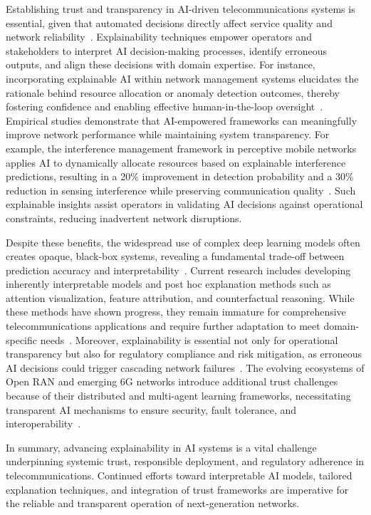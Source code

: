 \documentclass[sigconf]{acmart}
\begin{document}
Establishing trust and transparency in AI-driven telecommunications systems is essential, given that automated decisions directly affect service quality and network reliability~\cite{ref7,ref48,ref50,ref54}. Explainability techniques empower operators and stakeholders to interpret AI decision-making processes, identify erroneous outputs, and align these decisions with domain expertise. For instance, incorporating explainable AI within network management systems elucidates the rationale behind resource allocation or anomaly detection outcomes, thereby fostering confidence and enabling effective human-in-the-loop oversight~\cite{ref7}. Empirical studies demonstrate that AI-empowered frameworks can meaningfully improve network performance while maintaining system transparency. For example, the interference management framework in perceptive mobile networks applies AI to dynamically allocate resources based on explainable interference predictions, resulting in a 20\% improvement in detection probability and a 30\% reduction in sensing interference while preserving communication quality~\cite{ref48}. Such explainable insights assist operators in validating AI decisions against operational constraints, reducing inadvertent network disruptions.

Despite these benefits, the widespread use of complex deep learning models often creates opaque, black-box systems, revealing a fundamental trade-off between prediction accuracy and interpretability~\cite{ref54}. Current research includes developing inherently interpretable models and post hoc explanation methods such as attention visualization, feature attribution, and counterfactual reasoning. While these methods have shown progress, they remain immature for comprehensive telecommunications applications and require further adaptation to meet domain-specific needs~\cite{ref50}. Moreover, explainability is essential not only for operational transparency but also for regulatory compliance and risk mitigation, as erroneous AI decisions could trigger cascading network failures~\cite{ref48}. The evolving ecosystems of Open RAN and emerging 6G networks introduce additional trust challenges because of their distributed and multi-agent learning frameworks, necessitating transparent AI mechanisms to ensure security, fault tolerance, and interoperability~\cite{ref54}. 

In summary, advancing explainability in AI systems is a vital challenge underpinning systemic trust, responsible deployment, and regulatory adherence in telecommunications. Continued efforts toward interpretable AI models, tailored explanation techniques, and integration of trust frameworks are imperative for the reliable and transparent operation of next-generation networks.
\end{document}
